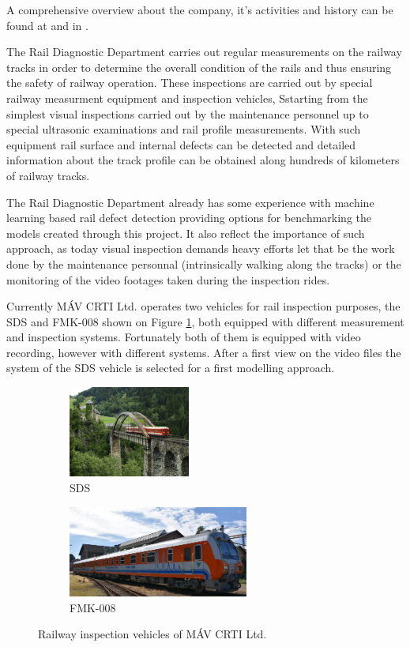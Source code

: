 A comprehensive overview about the company, it's activities and history can be found at
\cite{_mav_} and in \cite{kfv_25years}.

The Rail Diagnostic Department carries out regular measurements on the railway tracks in order
to determine the overall condition of the rails and thus ensuring the safety of railway operation.
These inspections are carried out by special railway measurment equipment and inspection vehicles,
Sstarting from the simplest visual inspections carried out by the maintenance personnel up to
special ultrasonic examinations and rail profile measurements.
With such equipment rail surface and internal defects can be detected and detailed information about
the track profile can be obtained along hundreds of kilometers of railway tracks.

The Rail Diagnostic Department already has some experience with machine learning based rail
defect detection providing options for benchmarking the models created through this project.
It also reflect the importance of such approach, as today visual inspection demands heavy efforts
let that be the work done by the maintenance personnal (intrinsically walking along the tracks)
or the monitoring of the video footages taken during the inspection rides.

Currently MÁV CRTI Ltd. operates two vehicles for rail inspection purposes, the SDS and FMK-008 shown on
Figure \ref{fig:vehicles}, both equipped with different measurement and inspection systems.
Fortunately both of them is equipped with video recording, however with different systems.
After a first view on the video files the system of the SDS vehicle is selected for a first modelling
approach.

\begin{figure}[!ht]
    \centering
    \begin{subfigure}{0.45\textwidth}
        \centering
        \includegraphics[height=3cm]{./tex_images/sds.jpg}
        \caption*{SDS}
    \end{subfigure}
    \begin{subfigure}{0.45\textwidth}
        \centering
        \includegraphics[height=3cm]{./tex_images/FMK008.jpg}
        \caption*{FMK-008}
    \end{subfigure}
    \caption{Railway inspection vehicles of MÁV CRTI Ltd.}
    \label{fig:vehicles}
\end{figure}

